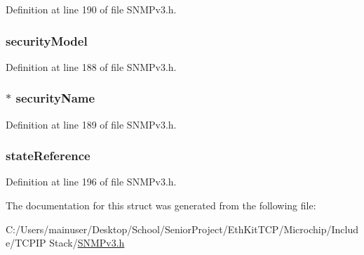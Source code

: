Definition at line 190 of file S\+N\+M\+Pv3.\+h.

\hypertarget{structdispatcher_process_pdu_ac19ed44216346e9d6c50819813db6867}{}
\subsubsection[{security\+Model}]{ security\+Model}\label{structdispatcher_process_pdu_ac19ed44216346e9d6c50819813db6867}


Definition at line 188 of file S\+N\+M\+Pv3.\+h.

\hypertarget{structdispatcher_process_pdu_a4a48a8746988a1f761c3e9eadcc20463}{}
\subsubsection[{security\+Name}]{$\ast$ security\+Name}\label{structdispatcher_process_pdu_a4a48a8746988a1f761c3e9eadcc20463}


Definition at line 189 of file S\+N\+M\+Pv3.\+h.

\hypertarget{structdispatcher_process_pdu_a62eef1407cf307242b77d068071cafeb}{}
\subsubsection[{state\+Reference}]{ state\+Reference}\label{structdispatcher_process_pdu_a62eef1407cf307242b77d068071cafeb}


Definition at line 196 of file S\+N\+M\+Pv3.\+h.



The documentation for this struct was generated from the following file\+:\begin{DoxyCompactItemize}
\item 
C\+:/\+Users/mainuser/\+Desktop/\+School/\+Senior\+Project/\+Eth\+Kit\+T\+C\+P/\+Microchip/\+Include/\+T\+C\+P\+I\+P Stack/\hyperlink{_s_n_m_pv3_8h}{S\+N\+M\+Pv3.\+h}\end{DoxyCompactItemize}
